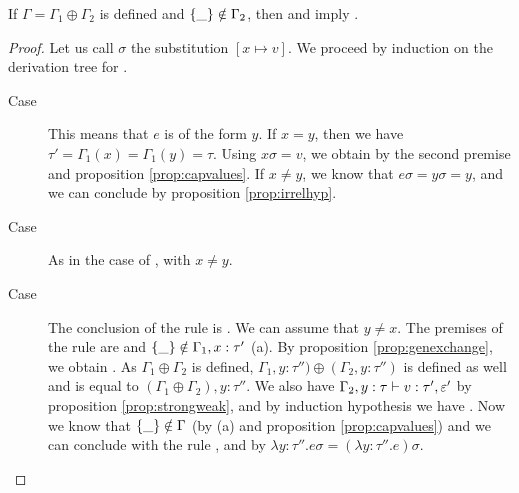 \documentclass[a4paper]{article}
\begin{document}
\begin{lem}
  \label{lem:substlem}
  If $\Gamma = \Gamma_1 \oplus \Gamma_2$ is defined and
  $\left\{ \_ \right\}\notin \Gamma_2$, then  and
   imply .
\end{lem}
\begin{proof}
  Let us call $\sigma$ the substitution $\left[ x \mapsto v \right]$.  We proceed
  by induction on the derivation tree for .
  \begin{description}

    \item[Case \varrule] This means that $e$ is of the form $y$. If $x = y$,
      then we have $\tau' = \Gamma_1(x) = \Gamma_1(y) = \tau$. Using $x\sigma = v$, we obtain
       by the second premise and proposition
      \ref{prop:capvalues}. If $x \neq y$, we
      know that $e\sigma = y\sigma = y$, and we can conclude by proposition
      \ref{prop:irrelhyp}. 

    \item[Case \conrule] As in the case of \varrule, with $x \neq y$.

    \item[Case \absrule] The conclusion of the rule is . We can assume that $y \neq x$. The
      premises of the rule are  and
      $\left\{ \_ \right\}\notin \Gamma_1,x:\tau'$ (a).  By proposition
      \ref{prop:genexchange}, we obtain . As
      $\Gamma_1 \oplus \Gamma_2$ is defined, $\Gamma_1, y : \tau'') \oplus (\Gamma_2, y : \tau'')$ is
      defined as well and is equal to $(\Gamma_1 \oplus \Gamma_2), y : \tau''$. We also
      have $\Gamma_2, y : \tau \vdash v : \tau', \varepsilon' $ by proposition
      \ref{prop:strongweak}, and by induction hypothesis we have
      . Now we know that $\left\{ \_ \right\}\notin \Gamma$
      (by (a) and proposition \ref{prop:capvalues}) and we can conclude with
      the rule \absrule, and by $\lambda y:\tau''.e\sigma = (\lambda y:\tau''.e)\sigma$.


\end{description}
\end{proof}
\end{document}
